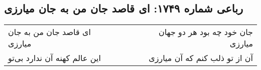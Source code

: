 \begin{center}
\section*{رباعی شماره ۱۷۴۹: ای قاصد جان من به جان میارزی}
\label{sec:1749}
\begin{longtable}{l p{0.5cm} r}
ای قاصد جان من به جان میارزی
&&
جان خود چه بود هر دو جهان میارزی
\\
این عالم کهنه آن ندارد بی‌تو
&&
آن از تو ذلب کنم که آن میارزی
\\
\end{longtable}
\end{center}
